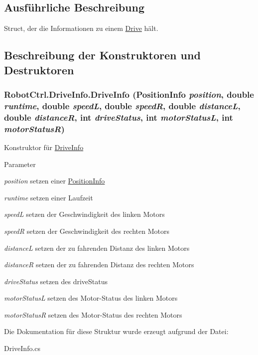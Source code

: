 \subsection{Ausführliche Beschreibung}
Struct, der die Informationen zu einem \hyperlink{class_robot_ctrl_1_1_drive}{Drive} h\"{a}lt. 

\subsection{Beschreibung der Konstruktoren und Destruktoren}
\hypertarget{struct_robot_ctrl_1_1_drive_info_a99d9fbb5a1b22a902112898282d68029}{
\subsubsection[{DriveInfo}]{\setlength{\rightskip}{0pt plus 5cm}RobotCtrl.DriveInfo.DriveInfo ({\bf PositionInfo} {\em position}, \/  double {\em runtime}, \/  double {\em speedL}, \/  double {\em speedR}, \/  double {\em distanceL}, \/  double {\em distanceR}, \/  int {\em driveStatus}, \/  int {\em motorStatusL}, \/  int {\em motorStatusR})}}
\label{struct_robot_ctrl_1_1_drive_info_a99d9fbb5a1b22a902112898282d68029}
Konstruktor f\"{u}r \hyperlink{struct_robot_ctrl_1_1_drive_info}{DriveInfo}


\begin{DoxyParams}{Parameter}
\item[{\em position}]setzen einer \hyperlink{struct_robot_ctrl_1_1_position_info}{PositionInfo} \item[{\em runtime}]setzen einer Laufzeit \item[{\em speedL}]setzen der Geschwindigkeit des linken Motors \item[{\em speedR}]setzen der Geschwindigkeit des rechten Motors \item[{\em distanceL}]setzen der zu fahrenden Distanz des linken Motors \item[{\em distanceR}]setzen der zu fahrenden Distanz des rechten Motors \item[{\em driveStatus}]setzen des driveStatus \item[{\em motorStatusL}]setzen des Motor-\/Status des linken Motors \item[{\em motorStatusR}]setzen des Motor-\/Status des rechten Motors \end{DoxyParams}


Die Dokumentation für diese Struktur wurde erzeugt aufgrund der Datei:\begin{DoxyCompactItemize}
\item 
DriveInfo.cs\end{DoxyCompactItemize}
